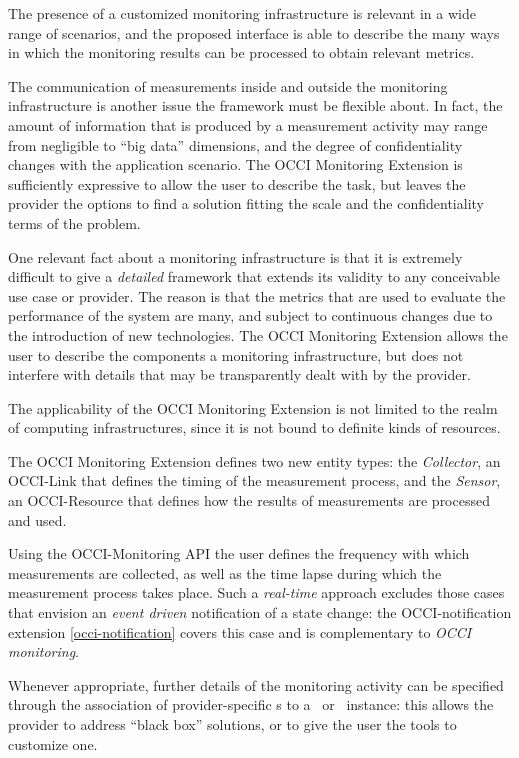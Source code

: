 \documentclass[10pt,a4paper]{article}
\begin{document}
The presence of a customized monitoring infrastructure is relevant in a wide range of scenarios, and the proposed interface is able to describe the many ways in which the monitoring results can be processed to obtain relevant metrics.

The communication of measurements inside and outside the monitoring infrastructure is another issue the framework must be flexible about. In fact, the amount of information that is produced by a measurement activity may range from negligible to ``big data'' dimensions, and the degree of confidentiality changes with the application scenario. The OCCI Monitoring Extension is sufficiently expressive to allow the user to describe the task, but leaves the provider the options to find a solution fitting the scale and the confidentiality terms of the problem.

One relevant fact about a monitoring infrastructure is that it is extremely difficult to give a {\em detailed} framework that extends its validity to any conceivable use case or provider. The reason is that the metrics that are used to evaluate the performance of the system are many, and subject to continuous changes due to the introduction of new technologies. The OCCI Monitoring Extension allows the user to describe the components a monitoring infrastructure, but does not interfere with details that may be transparently dealt with by the provider.

The applicability of the OCCI Monitoring Extension is not limited to the realm of computing infrastructures, since it is not bound to definite kinds of resources.

The OCCI Monitoring Extension defines two new entity types: the {\em Collector}, an OCCI-Link that defines the timing of the measurement process, and the {\em Sensor}, an OCCI-Resource that defines how the results of measurements are processed and used.

Using the OCCI-Monitoring API the user defines the frequency with which measurements are collected, as well as the time lapse during which the measurement process takes place. Such a {\em real-time} approach excludes those cases that envision an {\em event driven} notification of a state change: the OCCI-notification extension \ref{occi-notification} covers this case and is complementary to {\em OCCI monitoring}.

Whenever appropriate, further details of the monitoring activity can be specified through the association of provider-specific \mi s to a \sens\ or \coll\ instance: this allows the provider to address ``black box'' solutions, or to give the user the tools to customize one.
\end{document}
